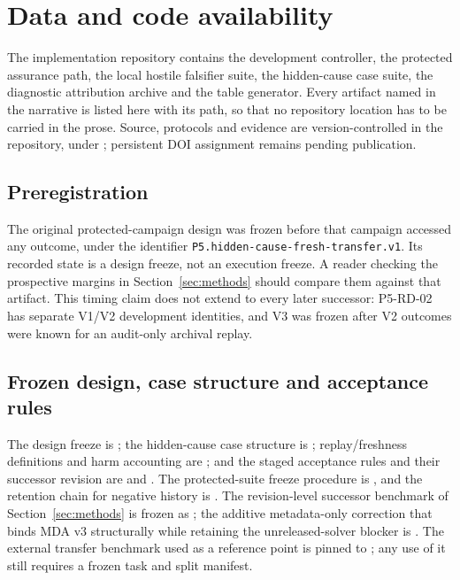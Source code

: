 \section{Data and code availability}
\label{sec:availability}

The implementation repository contains the development controller, the protected assurance path, the local hostile falsifier suite, the hidden-cause case suite, the diagnostic attribution archive and the table generator. Every artifact named in the narrative is listed here with its path, so that no repository location has to be carried in the prose. Source, protocols and evidence are version-controlled in the  repository, under ; persistent DOI assignment remains pending publication.

\subsection*{Preregistration}

The original protected-campaign design was frozen before that campaign accessed
any outcome, under the identifier
\texttt{P5.hidden-cause-fresh-transfer.v1}. Its recorded state is a design
freeze, not an execution freeze. A reader checking the prospective margins in
Section~\ref{sec:methods} should compare them against that artifact. This timing
claim does not extend to every later successor: P5-RD-02 has separate V1/V2
development identities, and V3 was frozen after V2 outcomes were known for an
audit-only archival replay.

\subsection*{Frozen design, case structure and acceptance rules}

The design freeze is ; the hidden-cause case structure is ; replay/freshness definitions and harm accounting are ; and the staged acceptance rules and their successor revision are  and . The protected-suite freeze procedure is , and the retention chain for negative history is . The revision-level successor benchmark of Section~\ref{sec:methods} is frozen as ; the additive metadata-only correction that binds MDA v3 structurally while retaining the unreleased-solver blocker is . The external transfer benchmark used as a reference point is pinned to ; any use of it still requires a frozen task and split manifest.

